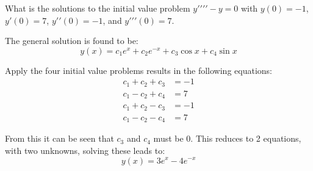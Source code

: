 What is the solutions to the initial value problem $y\prime\prime\prime\prime-y=0$ with $y(0)=-1$, $y\prime(0)=7$, $y\prime\prime(0)=-1$, and $y\prime\prime\prime(0)=7$.

The general solution is found to be:
\begin{equation*}
	y(x)=c_1e^x+c_2e^{-x}+c_3\cos x+c_4\sin x
\end{equation*}

Apply the four initial value problems results in the following equations:
\begin{align*}
	c_1+c_2+c_3&=-1\\
	c_1-c_2+c_4&=7\\
	c_1+c_2-c_3&=-1\\
	c_1-c_2-c_4&=7
\end{align*}

From this it can be seen that $c_3$ and $c_4$ must be $0$. This reduces to 2 equations, with two unknowns, solving these leads to:
\begin{equation*}
	\boxed{
		y(x)=3e^x-4e^{-x}
		}
\end{equation*}	